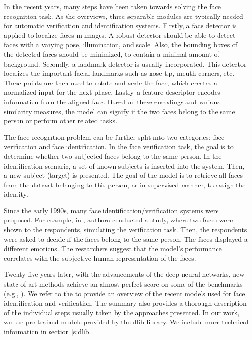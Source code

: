 In the recent years, many steps have been taken towards solving the face recognition task. As the \cite{ranjan2018deep} overviews, three separable modules are typically needed for automatic verification and identification systems. Firstly, a face detector is applied to localize faces in images. A robust detector should be able to detect faces with a varying pose, illumination, and scale. Also, the bounding boxes of the detected faces should be minimized, to contain a minimal amount of background. Secondly, a landmark detector is usually incorporated. This detector localizes the important facial landmarks such as nose tip, mouth corners, etc. These points are then used to rotate and scale the face, which creates a normalized input for the next phase. Lastly, a feature descriptor encodes information from the aligned face. Based on these encodings and various similarity measures, the model can signify if the two faces belong to the same person or perform other related tasks.

The face recognition problem can be further split into two categories: face verification and face identification. In the face verification task, the goal is to determine whether two subjected faces belong to the same person. In the identification scenario,
a set of known subjects is inserted into the system. Then, a new subject (target) is presented. The goal of the model is to retrieve all faces from the dataset belonging to this person, or in supervised manner, to assign the identity.

Since the early 1990s, many face identification/verification systems were proposed. For example, in \citep{kalocsai1998face}, authors conducted a study, where two faces were shown to the respondents, simulating the verification task. Then, the respondents were asked to decide if the faces belong to the same person. The faces displayed a different emotions. The researchers suggest that the model's performance correlates with the subjective human representation of the faces.

Twenty-five years later, with the advancements of the deep neural networks, new state-of-art methods achieve an almost perfect score on some of the benchmarks (e.g., \citep{huang2008labeled}). We refer to the \citep{masi2018deep} to provide an overview of the recent models used for face identification and verification. The summary also provides a thorough description of the individual steps usually taken by the approaches presented. In our work, we use pre-trained models provided by the dlib library. We include more technical information in section \ref{s:dlib}.

